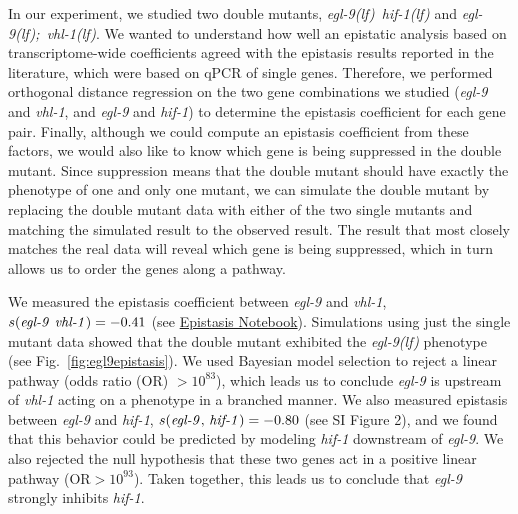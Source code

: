 \documentclass[9pt,twocolumn,twoside]{pnas-new}
\newcommand{\gene}[1]{\mbox{\emph{#1}}}
\newcommand{\egl}{\gene{egl-9(lf)}}
\newcommand{\eglvhl}{\gene{egl-9(lf); vhl-1(lf)}}
\newcommand{\eglhif}{\gene{egl-9(lf) hif-1(lf)}}
\begin{document}
In our experiment, we studied two double mutants, \eglhif{} and \eglvhl{}. We
wanted to understand how well an epistatic analysis based on transcriptome-wide
coefficients agreed with the epistasis results reported in the literature, which
were based on qPCR of single genes. Therefore, we performed orthogonal distance
regression on the two gene combinations we studied (\gene{egl-9} and
\gene{vhl-1}, and \gene{egl-9} and \gene{hif-1}) to determine the epistasis
coefficient for each gene pair.
\color{purple}
Finally, although we could compute an epistasis
coefficient from these factors, we would also like to know which gene is being
suppressed in the double mutant. Since suppression means that the double mutant
should have exactly the phenotype of one and only one mutant, we can simulate
the double mutant by replacing the double mutant data with either of the two
single mutants and matching the simulated result to the observed result. The
result that most closely matches the real data will reveal which gene is being
suppressed, which in turn allows us to order the genes along a pathway.
\color{black}

We measured the epistasis coefficient between \gene{egl-9} and \gene{vhl-1},
$s({\text{\gene{egl-9} \gene{vhl-1}}}) = -0.41$ (see
\href{https://wormlabcaltech.github.io/mprsq/analysis_notebooks/6_epistasis.html}
{Epistasis Notebook}). Simulations using just the
single mutant data showed that the double mutant exhibited the \egl{} phenotype
(see Fig.~\ref{fig:egl9epistasis}). We used Bayesian model selection to reject a
linear pathway (odds ratio (OR) $>10^{83}$), which leads us to conclude
\gene{egl-9} is upstream of \gene{vhl-1} acting on a phenotype in a branched
manner. We also measured epistasis between \gene{egl-9} and \gene{hif-1},
$s({\text{\gene{egl-9}, \gene{hif-1}}}) = -0.80$ (see SI Figure 2), and we found
that this behavior could be predicted by modeling \gene{hif-1} downstream of
\gene{egl-9}. We also rejected the null hypothesis that these two genes act in a
positive linear pathway (OR$> 10^{93}$). Taken together, this leads us to
conclude that \gene{egl-9} strongly inhibits \gene{hif-1}.
\end{document}
